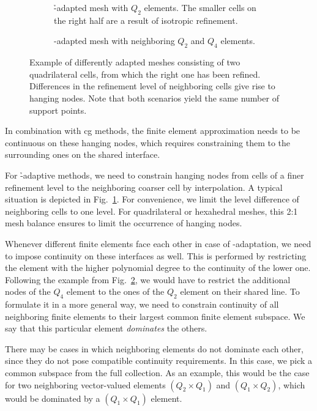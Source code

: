 \begin{figure}
\begin{subfigure}[t]{0.48\textwidth}
  \centering
  
  \caption{\h-adapted mesh with $Q_2$ elements. The smaller cells on the right half are a result of isotropic refinement.}
  \label{fig:hapaptivity}
\end{subfigure}
\hfill{}
\begin{subfigure}[t]{0.48\textwidth}
  \centering
  
  \caption{\p-adapted mesh with neighboring $Q_2$ and $Q_4$ elements.}
  \label{fig:papaptivity}
\end{subfigure}
\caption[Difference between \h- and \p-adaptation.]{Example of differently adapted meshes consisting of two quadrilateral cells, from which the right one has been refined. Differences in the refinement level of neighboring cells give rise to hanging nodes. Note that both scenarios yield the same number of support points.}
\label{fig:hpadaptivity}
\end{figure}

In combination with \gls{cg} methods, the finite element approximation needs to be continuous on these hanging nodes, which requires constraining them to the surrounding ones on the shared interface.

For \h-adaptive methods, we need to constrain hanging nodes from cells of a finer refinement level to the neighboring coarser cell by interpolation. A typical situation is depicted in Fig.~\ref{fig:hapaptivity}. For convenience, we limit the level difference of neighboring cells to one level.
For quadrilateral or hexahedral meshes, this 2:1 mesh balance ensures to limit the occurrence of hanging nodes.

Whenever different finite elements face each other in case of \p-adaptation, we need to impose continuity on these interfaces as well. This is performed by restricting the element with the higher polynomial degree to the continuity of the lower one. Following the example from Fig.~\ref{fig:papaptivity}, we would have to restrict the additional nodes of the $Q_4$ element to the ones of the $Q_2$ element on their shared line. To formulate it in a more general way, we need to constrain continuity of all neighboring finite elements to their largest common finite element subspace. We say that this particular element \textit{dominates} the others.

There may be cases in which neighboring elements do not dominate each other, since they do not pose compatible continuity requirements. In this case, we pick a common subspace from the full collection. As an example, this would be the case for two neighboring vector-valued elements $(Q_2 \times Q_1)$ and $(Q_1 \times Q_2)$, which would be dominated by a $(Q_1 \times Q_1)$ element.

